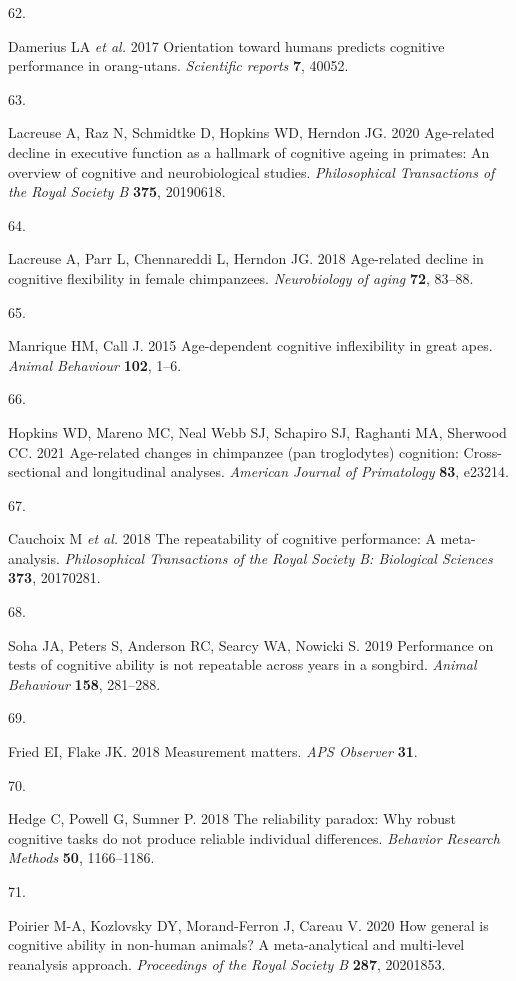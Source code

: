 \documentclass[
  man,floatsintext]{apa6}
\newlength{\cslhangindent}
\newlength{\csllabelwidth}
\newenvironment{CSLReferences}[2] %
 {\begin{list}{}{%
  \setlength{\itemindent}{0pt}
  \setlength{\leftmargin}{0pt}
  \setlength{\parsep}{0pt}
  \ifodd #1
   \setlength{\leftmargin}{\cslhangindent}
   \setlength{\itemindent}{-1\cslhangindent}
  \fi
  \setlength{\itemsep}{#2\baselineskip}}}
 {\end{list}}
\newcommand{\CSLLeftMargin}[1]{\parbox[t]{\csllabelwidth}{\strut#1\strut}}
\newcommand{\CSLRightInline}[1]{\parbox[t]{\linewidth - \csllabelwidth}{\strut#1\strut}}
\begin{document}
\begin{CSLReferences}{0}{1}
\CSLLeftMargin{62. }%
\CSLRightInline{Damerius LA \emph{et al.} 2017 Orientation toward humans predicts cognitive performance in orang-utans. \emph{Scientific reports} \textbf{7}, 40052.}

\CSLLeftMargin{63. }%
\CSLRightInline{Lacreuse A, Raz N, Schmidtke D, Hopkins WD, Herndon JG. 2020 Age-related decline in executive function as a hallmark of cognitive ageing in primates: An overview of cognitive and neurobiological studies. \emph{Philosophical Transactions of the Royal Society B} \textbf{375}, 20190618.}

\CSLLeftMargin{64. }%
\CSLRightInline{Lacreuse A, Parr L, Chennareddi L, Herndon JG. 2018 Age-related decline in cognitive flexibility in female chimpanzees. \emph{Neurobiology of aging} \textbf{72}, 83--88.}

\CSLLeftMargin{65. }%
\CSLRightInline{Manrique HM, Call J. 2015 Age-dependent cognitive inflexibility in great apes. \emph{Animal Behaviour} \textbf{102}, 1--6.}

\CSLLeftMargin{66. }%
\CSLRightInline{Hopkins WD, Mareno MC, Neal Webb SJ, Schapiro SJ, Raghanti MA, Sherwood CC. 2021 Age-related changes in chimpanzee (pan troglodytes) cognition: Cross-sectional and longitudinal analyses. \emph{American Journal of Primatology} \textbf{83}, e23214.}

\CSLLeftMargin{67. }%
\CSLRightInline{Cauchoix M \emph{et al.} 2018 The repeatability of cognitive performance: A meta-analysis. \emph{Philosophical Transactions of the Royal Society B: Biological Sciences} \textbf{373}, 20170281.}

\CSLLeftMargin{68. }%
\CSLRightInline{Soha JA, Peters S, Anderson RC, Searcy WA, Nowicki S. 2019 Performance on tests of cognitive ability is not repeatable across years in a songbird. \emph{Animal Behaviour} \textbf{158}, 281--288.}

\CSLLeftMargin{69. }%
\CSLRightInline{Fried EI, Flake JK. 2018 Measurement matters. \emph{APS Observer} \textbf{31}.}

\CSLLeftMargin{70. }%
\CSLRightInline{Hedge C, Powell G, Sumner P. 2018 The reliability paradox: Why robust cognitive tasks do not produce reliable individual differences. \emph{Behavior Research Methods} \textbf{50}, 1166--1186.}

\CSLLeftMargin{71. }%
\CSLRightInline{Poirier M-A, Kozlovsky DY, Morand-Ferron J, Careau V. 2020 How general is cognitive ability in non-human animals? A meta-analytical and multi-level reanalysis approach. \emph{Proceedings of the Royal Society B} \textbf{287}, 20201853.}

\end{CSLReferences}
\end{document}
